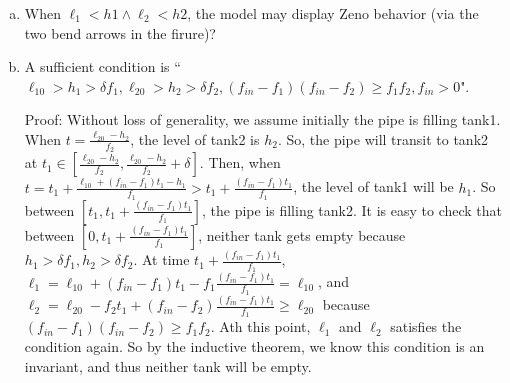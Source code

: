 \documentclass[11pt]{article}
\begin{document}
\begin{enumerate}[(a)]
	\item When $\ell_1 < h1 \wedge \ell_2 < h2$, the model may display Zeno behavior (via the two bend arrows in the firure)?
	\item A sufficient condition is ``$\ell_{10} > h_1 > \delta f_1, \ell_{20} > h_2 > \delta f_2, (f_{in} - f_1)(f_{in} - f_2) \geq f_1f_2, f_{in}>0$".

  Proof: Without loss of generality, we assume initially the pipe is filling tank1. When $t = \frac{\ell_{20} - h_2}{f_2}$, the level of tank2 is $h_2$. So, the pipe will transit to tank2 at $t_1 \in [\frac{\ell_{20} - h_2}{f_2}, \frac{\ell_{20} - h_2}{f_2}+\delta]$. Then, when $t = t_1 + \frac{\ell_{10} + (f_{in}-f_1)t_1 - h_1}{f_1} > t_1 + \frac{(f_{in}-f_1)t_1}{f_1}$, the level of tank1 will be $h_1$. So between $[t_1, t_1 + \frac{(f_{in}-f_1)t_1}{f_1}]$, the pipe is filling tank2. It is easy to check that between $[0, t_1 + \frac{(f_{in}-f_1)t_1}{f_1}]$, neither tank gets empty because $h_1 > \delta f_1, h_2 > \delta f_2$. At time $t_1 + \frac{(f_{in}-f_1)t_1}{f_1}$, $\ell_1 = \ell_{10} + (f_{in}-f_1)t_1 - f_1 \frac{(f_{in}-f_1)t_1}{f_1} = \ell_{10}$, and $\ell_2 = \ell_{20} - f_2 t_1 + (f_{in}-f_2)\frac{(f_{in}-f_1)t_1}{f_1} \geq \ell_{20}$ because $(f_{in} - f_1)(f_{in} - f_2) \geq f_1f_2$. Ath this point, $\ell_1$ and $\ell_2$ satisfies the condition again. So by the inductive theorem, we know this condition is an invariant, and thus neither tank will be empty.
\end{enumerate}
\end{document}
